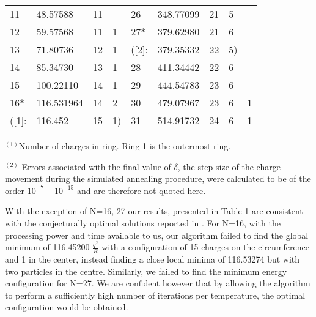 \documentclass[12pt,a4paper,final]{iopart}
\begin{document}
{\begin{table}[htbp]
\begin{threeparttable}
\begin{tabular}{lllllllll}
    \multicolumn{1}{l}{11} & \multicolumn{1}{l}{48.57588} & 11    &       & \multicolumn{1}{l}{26} & \multicolumn{1}{l}{348.77099} & 21    & 5     &  \\
    \multicolumn{1}{l}{12} & \multicolumn{1}{l}{59.57568} & 11    & 1     & \multicolumn{1}{l}{27*} & \multicolumn{1}{l}{379.62980} & 21    & 6     &  \\
    \multicolumn{1}{l}{13} & \multicolumn{1}{l}{71.80736} & 12    & 1     & \multicolumn{1}{l}{([2]:} & \multicolumn{1}{l}{379.35332} & 22    & 5)    &  \\
    \multicolumn{1}{l}{14} & \multicolumn{1}{l}{85.34730} & 13    & 1     & \multicolumn{1}{l}{28} & \multicolumn{1}{l}{411.34442} & 22    & 6     &  \\
    \multicolumn{1}{l}{15} & \multicolumn{1}{l}{100.22110} & 14    & 1     & \multicolumn{1}{l}{29} & \multicolumn{1}{l}{444.54783} & 23    & 6     &  \\
    \multicolumn{1}{l}{16*} & \multicolumn{1}{l}{116.531964 } & 14    & 2     & \multicolumn{1}{l}{30} & \multicolumn{1}{l}{479.07967} & 23    & 6     & 1 \\
    \multicolumn{1}{l}{([1]:} & \multicolumn{1}{l}{116.452} & 15    & 1)    & \multicolumn{1}{l}{31} & \multicolumn{1}{l}{514.91732} & 24    & 6     & 1 \\
    \bottomrule
    \end{tabular}%
    \begin{tablenotes}
      \small
      \item $^{(1)}$Number of charges in ring. Ring 1 is the outermost ring.
	\item $^{(2)}$ Errors associated with the final value of $\delta$, the step size of the charge movement during the simulated annealing procedure, were calculated to be of the order $10^{-7}-10^{-15}$ and are therefore not quoted here.
    \end{tablenotes}
  \label{tab:addlabel}%
 \end{threeparttable}
\label{tab:disc}
\end{table}%



With the exception of N=16, 27 our results, presented in Table \ref{tab:disc} are consistent with the conjecturally optimal solutions reported in \cite{oymak01, worley06,nurmela98}. For N=16, with the processing power and time available to us, our algorithm failed to find the global minimum  of 116.45200 $\frac{q^2}{R}$  \cite{nurmela98} with a configuration of 15 charges on the circumference and 1 in the center, instead finding a close local minima of 116.53274 but with two particles in the centre. Similarly, we failed to find the minimum energy configuration for N=27. We are confident however that by allowing the algorithm to perform a sufficiently high number of iterations per temperature, the optimal configuration would be obtained.

}
\end{document}
